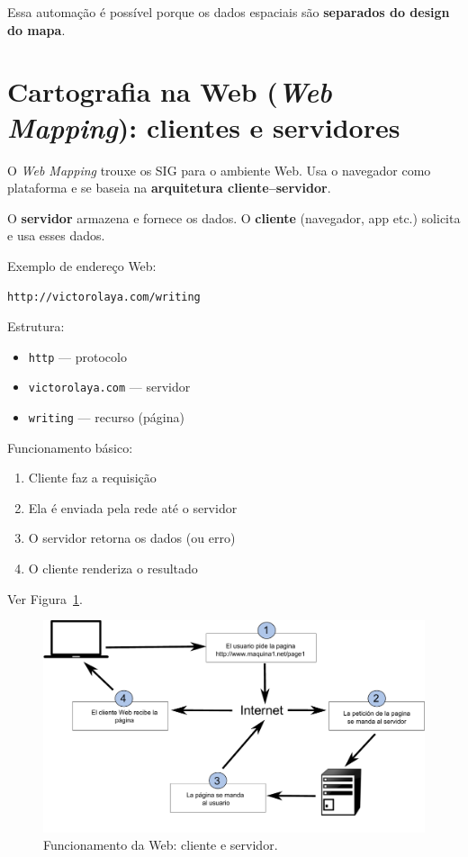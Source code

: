 Essa automação é possível porque os dados espaciais são \textbf{separados do design do mapa}.

\section{Cartografia na Web (\emph{Web Mapping}): clientes e servidores}

O \emph{Web Mapping} trouxe os SIG para o ambiente Web. Usa o navegador como plataforma e se baseia na \textbf{arquitetura cliente–servidor}.

O \textbf{servidor} armazena e fornece os dados. O \textbf{cliente} (navegador, app etc.) solicita e usa esses dados.

Exemplo de endereço Web:

\begin{center}
\small\texttt{http://victorolaya.com/writing}
\end{center}

Estrutura:

\begin{itemize}
 \item \texttt{http} — protocolo
 \item \texttt{victorolaya.com} — servidor
 \item \texttt{writing} — recurso (página)
\end{itemize}

Funcionamento básico:

\begin{enumerate}
 \item Cliente faz a requisição
 \item Ela é enviada pela rede até o servidor
 \item O servidor retorna os dados (ou erro)
 \item O cliente renderiza o resultado
\end{enumerate}

Ver Figura~\ref{Fig:Asi_funciona_internet}.

\begin{figure}[!hbt]   
\centering
\includegraphics[width=\columnwidth]{Software/Asi_funciona_internet.pdf}
\caption{\small Funcionamento da Web: cliente e servidor.}
\label{Fig:Asi_funciona_internet} 
\end{figure}


